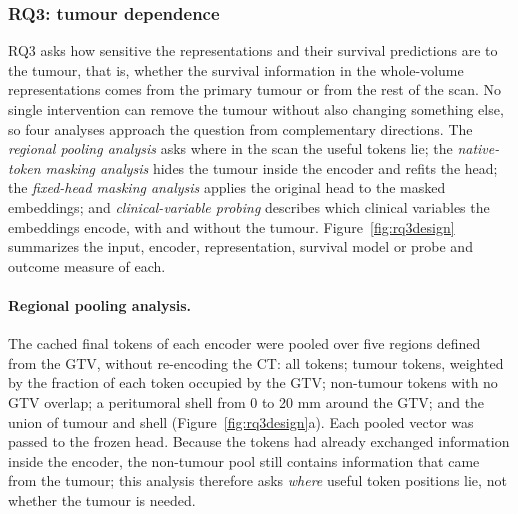 \subsubsection{RQ3: tumour dependence}\label{sec:perturbation}
RQ3 asks how sensitive the representations and their survival predictions are to the tumour, that is, whether the survival information in the whole-volume representations comes from the primary tumour or from the rest of the scan. No single intervention can remove the tumour without also changing something else, so four analyses approach the question from complementary directions. The \emph{regional pooling analysis} asks where in the scan the useful tokens lie; the \emph{native-token masking analysis} hides the tumour inside the encoder and refits the head; the \emph{fixed-head masking analysis} applies the original head to the masked embeddings; and \emph{clinical-variable probing} describes which clinical variables the embeddings encode, with and without the tumour. Figure~\ref{fig:rq3design} summarizes the input, encoder, representation, survival model or probe and outcome measure of each.



\paragraph{Regional pooling analysis.} The cached final tokens of each encoder were pooled over five regions defined from the GTV, without re-encoding the CT: all tokens; tumour tokens, weighted by the fraction of each token occupied by the GTV; non-tumour tokens with no GTV overlap; a peritumoral shell from 0 to 20 mm around the GTV; and the union of tumour and shell (Figure~\ref{fig:rq3design}a). Each pooled vector was passed to the frozen head. Because the tokens had already exchanged information inside the encoder, the non-tumour pool still contains information that came from the tumour; this analysis therefore asks \emph{where} useful token positions lie, not whether the tumour is needed.

